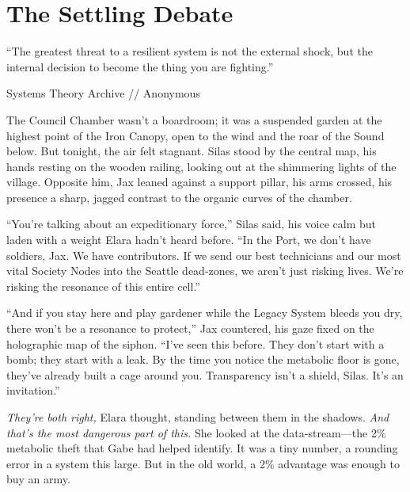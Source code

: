 \chapter{The Settling Debate}
\label{chap:08}

\epigraph{“The greatest threat to a resilient system is not the external shock, but the internal decision to become the thing you are fighting.”}{Systems Theory Archive // Anonymous}


The Council Chamber wasn't a boardroom; it was a suspended garden at the highest point of the Iron Canopy, open to the wind and the roar of the Sound below. But tonight, the air felt stagnant. Silas stood by the central map, his hands resting on the wooden railing, looking out at the shimmering lights of the village. Opposite him, Jax leaned against a support pillar, his arms crossed, his presence a sharp, jagged contrast to the organic curves of the chamber.

``You're talking about an expeditionary force,'' Silas said, his voice calm but laden with a weight Elara hadn't heard before. ``In the Port, we don't have soldiers, Jax. We have contributors. If we send our best technicians and our most vital Society Nodes into the Seattle dead-zones, we aren't just risking lives. We're risking the resonance of this entire cell.''

``And if you stay here and play gardener while the Legacy System bleeds you dry, there won't be a resonance to protect,'' Jax countered, his gaze fixed on the holographic map of the siphon. ``I've seen this before. They don't start with a bomb; they start with a leak. By the time you notice the metabolic floor is gone, they've already built a cage around you. Transparency isn't a shield, Silas. It's an invitation.''

\textit{They're both right,} Elara thought, standing between them in the shadows. \textit{And that's the most dangerous part of this.} She looked at the data-stream—the 2\% metabolic theft that Gabe had helped identify. It was a tiny number, a rounding error in a system this large. But in the old world, a 2\% advantage was enough to buy an army.

